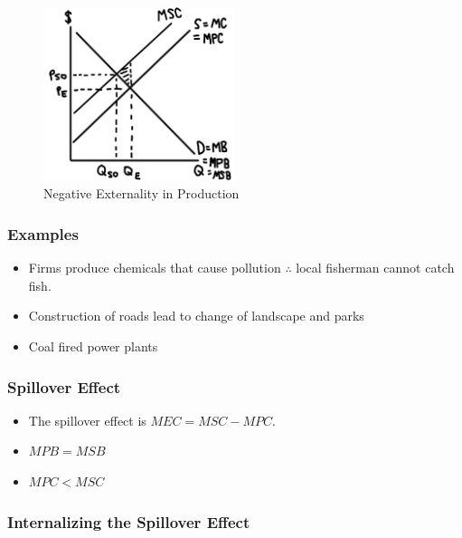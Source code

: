 \documentclass[
  letterpaper,
  DIV=11,
  numbers=noendperiod]{scrartcl}
\providecommand{\tightlist}{%
  \setlength{\itemsep}{0pt}\setlength{\parskip}{0pt}}\usepackage{longtable,booktabs,array}
\begin{document}
\begin{figure}

{\centering \includegraphics[width=0.5\textwidth,height=\textheight]{img/neg-prod.png}

}

\caption{Negative Externality in Production}

\end{figure}

\hypertarget{examples-5}{%
\subsubsection{Examples}\label{examples-5}}

\begin{itemize}
\tightlist
\item
  Firms produce chemicals that cause pollution \(\therefore\) local
  fisherman cannot catch fish.
\item
  Construction of roads lead to change of landscape and parks
\item
  Coal fired power plants
\end{itemize}

\hypertarget{spillover-effect-3}{%
\subsubsection{Spillover Effect}\label{spillover-effect-3}}

\begin{itemize}
\tightlist
\item
  The spillover effect is \(MEC = MSC-MPC\).
\item
  \(MPB = MSB\)
\item
  \(MPC < MSC\)
\end{itemize}

\hypertarget{internalizing-the-spillover-effect-3}{%
\subsubsection{Internalizing the Spillover
Effect}\label{internalizing-the-spillover-effect-3}}
\end{document}
